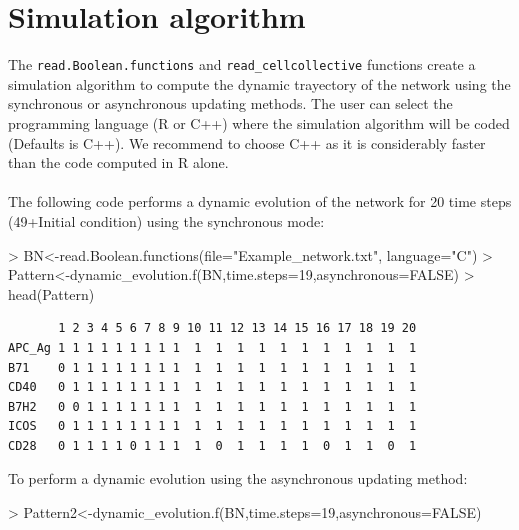 \documentclass[a4paper]{article}
\begin{document}
\section{Simulation algorithm}
The \texttt{read.Boolean.functions} and \texttt{read\_cellcollective} functions create a simulation algorithm to compute the dynamic trayectory of the network using the synchronous or asynchronous updating methods. The user can select the programming language (R or C++) where the simulation algorithm will be coded (Defaults is C++). We recommend to choose C++ as it is considerably faster than the code computed in R alone.\\
\\
The following code performs a dynamic evolution of the network for 20 time steps (49+Initial condition) using the synchronous mode:
\begin{Schunk}
\begin{Sinput}
> BN<-read.Boolean.functions(file="Example_network.txt", language="C")
> Pattern<-dynamic_evolution.f(BN,time.steps=19,asynchronous=FALSE)
> head(Pattern)
\end{Sinput}
\end{Schunk}
\begin{verbatim}
       1 2 3 4 5 6 7 8 9 10 11 12 13 14 15 16 17 18 19 20
APC_Ag 1 1 1 1 1 1 1 1 1  1  1  1  1  1  1  1  1  1  1  1
B71    0 1 1 1 1 1 1 1 1  1  1  1  1  1  1  1  1  1  1  1
CD40   0 1 1 1 1 1 1 1 1  1  1  1  1  1  1  1  1  1  1  1
B7H2   0 0 1 1 1 1 1 1 1  1  1  1  1  1  1  1  1  1  1  1
ICOS   0 1 1 1 1 1 1 1 1  1  1  1  1  1  1  1  1  1  1  1
CD28   0 1 1 1 1 0 1 1 1  1  0  1  1  1  1  0  1  1  0  1
\end{verbatim}

To perform a dynamic evolution using the asynchronous updating method:
\begin{Schunk}
\begin{Sinput}
> Pattern2<-dynamic_evolution.f(BN,time.steps=19,asynchronous=FALSE)
\end{Sinput}
\end{Schunk}
\end{document}
